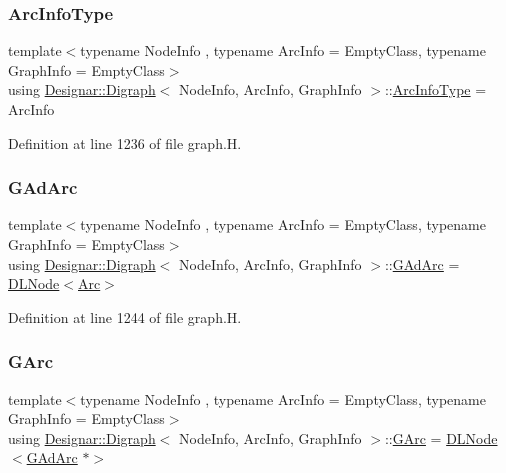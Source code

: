 \subsubsection{\texorpdfstring{Arc\+Info\+Type}{ArcInfoType}}
{\footnotesize\ttfamily template$<$typename Node\+Info , typename Arc\+Info  = Empty\+Class, typename Graph\+Info  = Empty\+Class$>$ \\
using \hyperlink{class_designar_1_1_digraph}{Designar\+::\+Digraph}$<$ Node\+Info, Arc\+Info, Graph\+Info $>$\+::\hyperlink{class_designar_1_1_digraph_a84a736f6c32da0fcbd1d047e74264d00}{Arc\+Info\+Type} =  Arc\+Info}



Definition at line 1236 of file graph.\+H.

\mbox{\label{class_designar_1_1_digraph_a0c6d846f23d1e82556fb6055557df53f}} 
\subsubsection{\texorpdfstring{G\+Ad\+Arc}{GAdArc}}
{\footnotesize\ttfamily template$<$typename Node\+Info , typename Arc\+Info  = Empty\+Class, typename Graph\+Info  = Empty\+Class$>$ \\
using \hyperlink{class_designar_1_1_digraph}{Designar\+::\+Digraph}$<$ Node\+Info, Arc\+Info, Graph\+Info $>$\+::\hyperlink{class_designar_1_1_digraph_a0c6d846f23d1e82556fb6055557df53f}{G\+Ad\+Arc} =  \hyperlink{class_designar_1_1_d_l_node}{D\+L\+Node}$<$\hyperlink{class_designar_1_1_digraph_a0ceb278671f2a535c00fddccdeafd69f}{Arc}$>$\hspace{0.3cm}{\ttfamily [protected]}}



Definition at line 1244 of file graph.\+H.

\mbox{\label{class_designar_1_1_digraph_a341acf8fb0195a8986158c29c4db1a89}} 
\subsubsection{\texorpdfstring{G\+Arc}{GArc}}
{\footnotesize\ttfamily template$<$typename Node\+Info , typename Arc\+Info  = Empty\+Class, typename Graph\+Info  = Empty\+Class$>$ \\
using \hyperlink{class_designar_1_1_digraph}{Designar\+::\+Digraph}$<$ Node\+Info, Arc\+Info, Graph\+Info $>$\+::\hyperlink{class_designar_1_1_digraph_a341acf8fb0195a8986158c29c4db1a89}{G\+Arc} =  \hyperlink{class_designar_1_1_d_l_node}{D\+L\+Node}$<$\hyperlink{class_designar_1_1_digraph_a0c6d846f23d1e82556fb6055557df53f}{G\+Ad\+Arc} $\ast$$>$\hspace{0.3cm}{\ttfamily [protected]}}



